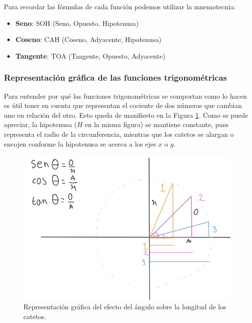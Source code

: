 \documentclass[
]{book}
\providecommand{\tightlist}{%
  \setlength{\itemsep}{0pt}\setlength{\parskip}{0pt}}
\begin{document}
Para recordar las fórmulas de cada función podemos utilizar la mnemotecnia:

\begin{itemize}
\tightlist
\item
  \textbf{Seno}: SOH (Seno, Opuesto, Hipotenusa)
\item
  \textbf{Coseno}: CAH (Coseno, Adyacente, Hipotenusa)
\item
  \textbf{Tangente}: TOA (Tangente, Opuesto, Adyacente)
\end{itemize}

\hypertarget{representaciuxf3n-gruxe1fica-de-las-funciones-trigonomuxe9tricas}{%
\subsubsection{Representación gráfica de las funciones trigonométricas}\label{representaciuxf3n-gruxe1fica-de-las-funciones-trigonomuxe9tricas}}

Para entender por qué las funciones trigonométricas se comportan como lo hacen es útil tener en cuenta que representan el cociente de dos números que cambian uno en relación del otro. Esto queda de manifiesto en la Figura \ref{fig:catetos}. Como se puede apreciar, la hipotenusa (\(H\) en la misma figura) se mantiene constante, pues representa el radio de la circunferencia, mientras que los catetos se alargan o encojen conforme la hipotenusa se acerca a los ejes \(x\) o \(y\).

\begin{figure}

{\centering \includegraphics[width=9.53in]{Unidad-II/Func-trigo} 

}

\caption{Representación gráfica del efecto del ángulo sobre la longitud de los catetos.}\label{fig:catetos}
\end{figure}
\end{document}
